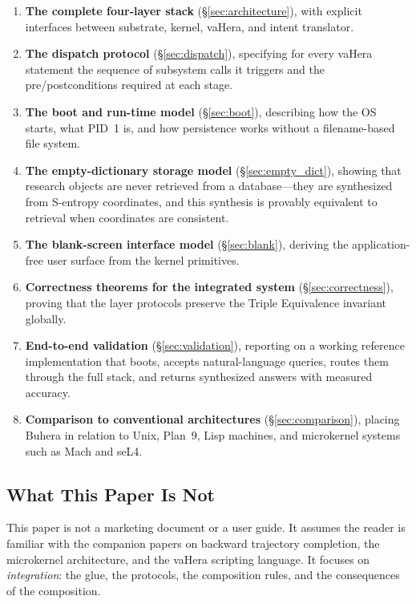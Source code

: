 \documentclass[11pt,twocolumn,a4paper]{article}
\begin{document}
\begin{enumerate}[leftmargin=*]
\item \textbf{The complete four-layer stack} (\S\ref{sec:architecture}), with explicit interfaces between substrate, kernel, vaHera, and intent translator.
\item \textbf{The dispatch protocol} (\S\ref{sec:dispatch}), specifying for every vaHera statement the sequence of subsystem calls it triggers and the pre/postconditions required at each stage.
\item \textbf{The boot and run-time model} (\S\ref{sec:boot}), describing how the OS starts, what PID~1 is, and how persistence works without a filename-based file system.
\item \textbf{The empty-dictionary storage model} (\S\ref{sec:empty_dict}), showing that research objects are never retrieved from a database---they are synthesized from S-entropy coordinates, and this synthesis is provably equivalent to retrieval when coordinates are consistent.
\item \textbf{The blank-screen interface model} (\S\ref{sec:blank}), deriving the application-free user surface from the kernel primitives.
\item \textbf{Correctness theorems for the integrated system} (\S\ref{sec:correctness}), proving that the layer protocols preserve the Triple Equivalence invariant globally.
\item \textbf{End-to-end validation} (\S\ref{sec:validation}), reporting on a working reference implementation that boots, accepts natural-language queries, routes them through the full stack, and returns synthesized answers with measured accuracy.
\item \textbf{Comparison to conventional architectures} (\S\ref{sec:comparison}), placing Buhera in relation to Unix, Plan~9, Lisp machines, and microkernel systems such as Mach and seL4.
\end{enumerate}

\subsection{What This Paper Is Not}

This paper is not a marketing document or a user guide. It assumes the reader is familiar with the companion papers on backward trajectory completion, the microkernel architecture, and the vaHera scripting language. It focuses on \emph{integration}: the glue, the protocols, the composition rules, and the consequences of the composition.
\end{document}
